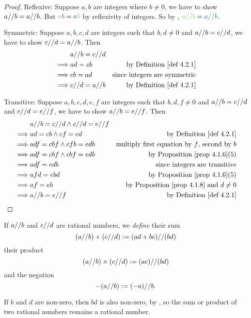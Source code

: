 \begin{proof}
Reflexive: Suppose \(a, b\) are integers where \(b \neq 0\), we have to show \(a \text{//} b = a \text{//} b\).
But \(\GREEN{a}\BLUE{b} = \BLUE{a}\GREEN{b}\) by reflexivity of integers. So by , \(\GREEN{a \D b} = \BLUE{a \D b}\).

Symmetric: Suppose \(a, b, c, d\) are integers such that \(b, d \neq 0\) and \(a \text{//} b = c \text{//} d\), we have to show \(c \text{//} d = a \text{//} b\). Then
\begin{align*}
             & a \D b = c \D d \\
    \implies & ad = cb & \text{by \DEF{4.2.1}} \\
    \implies & cb = ad & \text{since integers are symmetric} \\
    \implies & c \D d = a \D b & \text{by \DEF{4.2.1}}
\end{align*}

Transitive: Suppose \(a, b, c, d, e, f\) are integers such that \(b, d, f \neq 0\) and \(a \text{//} b = c \text{//} d\) and \(c \text{//} d = e \text{//} f\), we have to show \(a \text{//} b = e \text{//} f\). Then
\begin{align*}
             & a \D b = c \D d \land c \D d = e \D f \\
    \implies & ad = cb \land cf = ed & \text{by \DEF{4.2.1}} \\
    \implies & adf = cbf \land cfb = edb & \text{multiply first equation by \(f\), second by \(b\)}\\
    \implies & adf = cbf \land cbf = edb & \text{by \PROP{4.1.6}(5)} \\
    \implies & adf = edb & \text{since integers are transitive} \\
    \implies & afd = ebd & \text{by \PROP{4.1.6}(5)} \\
    \implies & af = eb & \text{by \PROP{4.1.8} and \(d \neq 0\)} \\
    \implies & a \D b = e \D f & \text{by \DEF{4.2.1}}
\end{align*}
\end{proof}

\begin{definition} \label{def 4.2.2}
If \(a \text{//} b\) and \(c \text{//} d\) are rational numbers, we \emph{define} their sum
\[
    (a \text{//} b) + (c \text{//} d) := (ad + bc) \text{//} (bd)
\]
their product
\[
    (a \text{//} b) \times (c \text{//} d) := (ac) \text{//} (bd)
\]
and the negation
\[
    -(a \text{//} b) := (-a) \text{//} b.
\]
\end{definition}

\begin{note}
If \(b\) and \(d\) are non-zero, then \(bd\) is also non-zero, by , so the sum or product of two rational numbers remains a
rational number.
\end{note}

